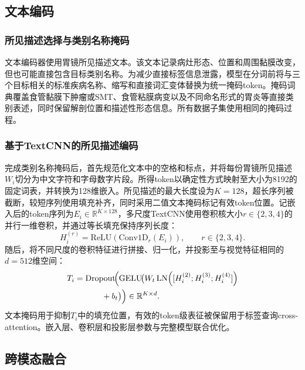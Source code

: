\documentclass[Afour,sagev,times]{sagej}
\begin{document}
\subsection{文本编码}

\subsubsection{所见描述选择与类别名称掩码}

文本编码器使用胃镜所见描述文本。该文本记录病灶形态、位置和周围黏膜改变，但也可能直接包含目标类别名称。为减少直接标签信息泄露，模型在分词前将与三个目标相关的标准疾病名称、缩写和直接词汇变体替换为统一掩码token。掩码词典覆盖食管黏膜下肿瘤或SMT、食管粘膜病变以及不同命名形式的胃炎等直接类别表述，同时保留解剖位置和描述性形态信息。所有数据子集使用相同的掩码过程。

\subsubsection{基于TextCNN的所见描述编码}

完成类别名称掩码后，首先规范化文本中的空格和标点，并将每份胃镜所见描述$W_i$切分为中文字符和字母数字片段。所得token以确定性方式映射至大小为8192的固定词表，并转换为128维嵌入。所见描述的最大长度设为$K=128$，超长序列被截断，较短序列使用填充补齐，同时采用二值文本掩码标记有效token位置。记嵌入后的token序列为$E_i\in\mathbb{R}^{K\times128}$，多尺度TextCNN使用卷积核大小$r\in\{2,3,4\}$的并行一维卷积，并通过等长填充保持序列长度：
\begin{equation}
H_i^{(r)}=\mathrm{ReLU}\!\left(\mathrm{Conv1D}_{r}(E_i)\right),
\qquad r\in\{2,3,4\}.
\end{equation}
随后，将不同尺度的卷积特征进行拼接、归一化，并投影至与视觉特征相同的$d=512$维空间：
\begin{equation}
\begin{aligned}
T_i={}&\mathrm{Dropout}\!\Bigl(\mathrm{GELU}\!\bigl(
W_t\,\mathrm{LN}\!\left([H_i^{(2)};H_i^{(3)};H_i^{(4)}]\right)\\
&\qquad+b_t\bigr)\Bigr)\in\mathbb{R}^{K\times d}.
\end{aligned}
\end{equation}
文本掩码用于抑制$T_i$中的填充位置，有效的token级表征被保留用于标签查询cross-attention。嵌入层、卷积层和投影层参数与完整模型联合优化。

\subsection{跨模态融合}
\end{document}
